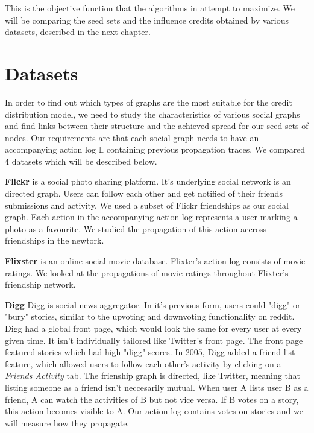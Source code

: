 \documentclass{acm_proc_article-sp}
\begin{document}
This is the objective function that the algorithms in \cite{goyal:datainfluence} attempt to maximize. We will be comparing the seed sets and the influence credits obtained by various datasets, described in the next chapter.



\section{Datasets}

In order to find out which types of graphs are the most suitable for the credit distribution model, we need to study the characteristics of various social graphs and find links between their structure and the achieved spread for our seed sets of nodes. Our requirements are that each social graph needs to have an accompanying action log $\mathbb{L}$ containing previous propagation traces. We compared 4 datasets which will be described below.

\textbf{Flickr} \cite{data:flickr} is a social photo sharing platform. It's underlying social network is an directed graph. Users can follow each other and get notified of their friends submissions and activity. We used a subset of Flickr friendships as our social graph. Each action in the accompanying action log represents a user marking a photo as a favourite. We studied the propagation of this action accross friendships in the newtork. \cite{data:flickr-paper}

\textbf{Flixster} \cite{data:flixster} is an online social movie database. Flixter's action log consists of movie ratings. We looked at the propagations of movie ratings throughout Flixter's friendship network. \cite{data:flixsterpaper}

\textbf{Digg} \cite{data:digg-friends,data:digg-votes,data:digg} Digg is social news aggregator. In it's previous form, users could "digg" or "bury" stories, similar to the upvoting and downvoting functionality on reddit. Digg had a global front page, which would look the same for every user at every given time. It isn't individually tailored like Twitter's front page. The front page featured stories which had high "digg" scores. In 2005, Digg added a friend list feature, which allowed users to follow each other's activity by clicking on a \textit{Friends Activity} tab. The frienship graph is directed, like Twitter, meaning that listing someone as a friend isn't neccesarily mutual. When user A lists user B as a friend, A can watch the activities of B but not vice versa. If B votes on a story, this action becomes visible to A. Our action log contains votes on stories and we will measure how they propagate. \cite{DBLP:journals/corr/abs-1202-3162}
\end{document}
